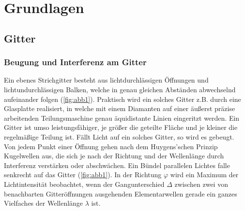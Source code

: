 \documentclass[11pt,ngerman]{scrartcl}
\begin{document}
\newpage

\section{Grundlagen}

\subsection{Gitter}

\subsubsection{Beugung und Interferenz am Gitter}

Ein ebenes Strichgitter besteht aus lichtdurchlässigen Öffnungen und lichtundurchlässigen Balken,
welche in genau gleichen Abständen abwechselnd aufeinander folgen (\autoref{fig:abb1}).
Praktisch wird ein solches Gitter z.B. durch eine Glasplatte realisiert, in welche mit einem
Diamanten auf einer äußerst präzise arbeitenden Teilungsmaschine genau äquidistante Linien
eingeritzt werden. Ein Gitter ist umso leistungsfähiger, je größer die geteilte Fläche und je kleiner
die regelmäßige Teilung ist. Fällt Licht auf ein solches Gitter, so wird es gebeugt. Von jedem
Punkt einer Öffnung gehen nach dem Huygens’schen Prinzip Kugelwellen aus, die sich je nach
der Richtung und der Wellenlänge durch Interferenz verstärken oder abschwächen. Ein Bündel
parallelen Lichtes falle senkrecht auf das Gitter (\autoref{fig:abb1}). In der Richtung $\varphi$ wird ein Maximum
der Lichtintensität beobachtet, wenn der Gangunterschied $\Delta$ zwischen zwei von benachbarten
Gitteröffnungen ausgehenden Elementarwellen gerade ein ganzes Vielfaches der Wellenlänge $\lambda$
ist.
\end{document}
